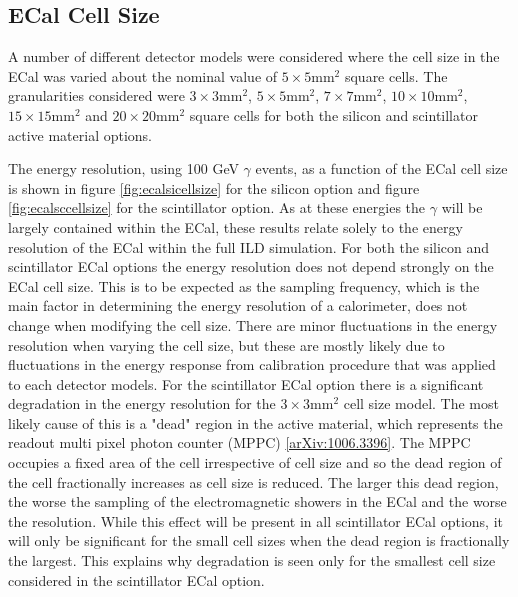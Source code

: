
\subsection{ECal Cell Size}
\label{sec:ecalcells}
A number of different detector models were considered where the cell size in the ECal was varied about the nominal value of $5 \times 5 \text{mm}^{2}$ square cells.  The granularities considered were $3 \times 3 \text{mm}^{2}$, $5 \times 5 \text{mm}^{2}$, $7 \times 7 \text{mm}^{2}$, $10 \times 10 \text{mm}^{2}$, $15 \times 15 \text{mm}^{2}$ and $20 \times 20 \text{mm}^{2}$ square cells for both the silicon and scintillator active material options.  

The energy resolution, using 100 GeV $\gamma$ events, as a function of the ECal cell size is shown in figure \ref{fig:ecalsicellsize} for the silicon option and figure \ref{fig:ecalsccellsize} for the scintillator option.  As at these energies the $\gamma$ will be largely contained within the ECal, these results relate solely to the energy resolution of the ECal within the full ILD simulation.  For both the silicon and scintillator ECal options the energy resolution does not depend strongly on the ECal cell size.  This is to be expected as the sampling frequency, which is the main factor in determining the energy resolution of a calorimeter, does not change when modifying the cell size.  There are minor fluctuations in the energy resolution when varying the cell size, but these are mostly likely due to fluctuations in the energy response from calibration procedure that was applied to each detector models.  For the scintillator ECal option there is a significant degradation in the energy resolution for the $3 \times 3 \text{mm}^{2}$ cell size model.  The most likely cause of this is a "dead" region in the active material, which represents the readout multi pixel photon counter (MPPC) \ref{arXiv:1006.3396}.  The MPPC occupies a fixed area of the cell irrespective of cell size and so the dead region of the cell fractionally increases as cell size is reduced.  The larger this dead region, the worse the sampling of the electromagnetic showers in the ECal and the worse the resolution.  While this effect will be present in all scintillator ECal options, it will only be significant for the small cell sizes when the dead region is fractionally the largest.  This explains why degradation is seen only for the smallest cell size considered in the scintillator ECal option.     

